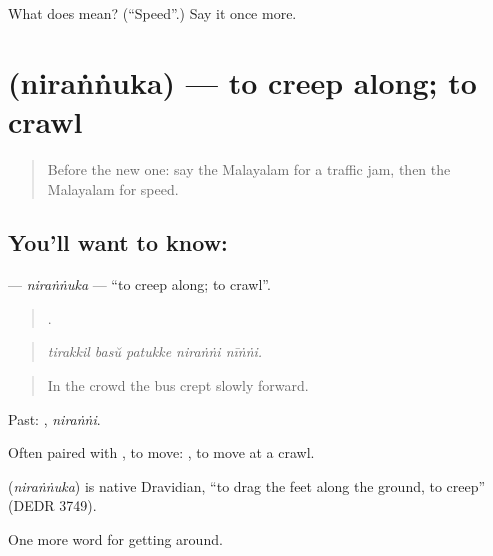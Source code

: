 \begin{tcolorbox}[breakable,colback=teal!4,colframe=teal!35!black,title={Before you move on}]
What does  mean? (\textquotedblleft{}Speed\textquotedblright{}.) Say it once more.
\end{tcolorbox}
\section[\texorpdfstring{\ml{നിരങ്ങുക} (niraṅṅuka)}{നിരങ്ങുക (niraṅṅuka)}]{ (niraṅṅuka) — to creep along; to crawl}

\label{lesson:ML-C472-nirannuka}



\begin{quote}
Before the new one: say the Malayalam for a traffic jam, then the Malayalam for speed.
\end{quote}

\subsection*{You'll want to know: }
\textbf{} — \emph{niraṅṅuka} — \textquotedblleft{}to creep along; to crawl\textquotedblright{}.

\begin{quote}
    .
\end{quote}

\begin{quote}
\emph{tirakkil basŭ patukke niraṅṅi nīṅṅi.}
\end{quote}

\begin{quote}
In the crowd the bus crept slowly forward.
\end{quote}

Past: , \emph{niraṅṅi}.

Often paired with , to move:  , to move at a crawl.

\begin{cousinweb}
\textbf{} (\emph{niraṅṅuka}) is native Dravidian, \textquotedblleft{}to drag the feet along the ground, to creep\textquotedblright{} (DEDR 3749).
\end{cousinweb}

\begin{grammarlens}[title={What you've built}]
One more word for getting around.
\end{grammarlens}

